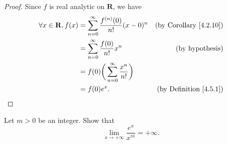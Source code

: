 \begin{proof}
    Since \(f\) is real analytic on \(\mathbf{R}\), we have
    \begin{align*}
        \forall x \in \mathbf{R}, f(x) & = \sum_{n = 0}^\infty \frac{f^{(n)}(0)}{n!} (x - 0)^n & \text{(by Corollary \ref{4.2.10})} \\
                                       & = \sum_{n = 0}^\infty \frac{f(0)}{n!} x^n             & \text{(by hypothesis)}             \\
                                       & = f(0) \bigg(\sum_{n = 0}^\infty \frac{x^n}{n!}\bigg)                                      \\
                                       & = f(0) e^x.                                           & \text{(by Definition \ref{4.5.1})}
    \end{align*}
\end{proof}

\begin{exercise}\label{ex 4.5.8}
    Let \(m > 0\) be an integer.
    Show that
    \[
        \lim_{x \to +\infty} \frac{e^x}{x^m} = +\infty.
    \]
\end{exercise}

